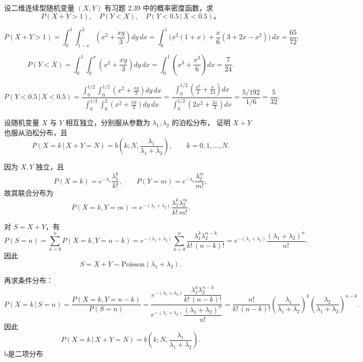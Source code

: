 \begin{homework}[53]

设二维连续型随机变量 $(X,Y)$ 有习题 2.39 中的概率密度函数，求
\[
P(X+Y>1),\quad P(Y<X),\quad P(Y<0.5\,|\,X<0.5)。
\]
\end{homework}
\begin{solution}
\[
P(X+Y>1)=\int_{0}^{1}\int_{1-x}^{2}\!\left(x^2+\frac{xy}{3}\right)dy\,dx
=\int_{0}^{1}\!\Big(x^2(1+x)+\frac{x}{6}(3+2x-x^2)\Big)\,dx=\frac{65}{72}.
\]

\[
P(Y<X)=\int_{0}^{1}\int_{0}^{x}\!\left(x^2+\frac{xy}{3}\right)dy\,dx
=\int_{0}^{1}\!\left(x^3+\frac{x^3}{6}\right)dx=\frac{7}{24}.
\]

\[
P(Y<0.5\,|\,X<0.5)
=\frac{\displaystyle\int_{0}^{1/2}\int_{0}^{1/2}\!\left(x^2+\frac{xy}{3}\right)dy\,dx}
{\displaystyle\int_{0}^{1/2}\int_{0}^{2}\!\left(x^2+\frac{xy}{3}\right)dy\,dx}
=\frac{\displaystyle\int_{0}^{1/2}\!\left(\frac{x^2}{2}+\frac{x}{24}\right)dx}{\displaystyle\int_{0}^{1/2}\!\left(2x^2+\frac{2x}{3}\right)dx}
=\frac{5/192}{1/6}=\frac{5}{32}.
\]
\end{solution}
\begin{homework}[56]
设随机变量 $X$ 与 $Y$ 相互独立，分别服从参数为 $\lambda_1,\lambda_2$ 的泊松分布，
证明 $X+Y$ 也服从泊松分布，且
\[
P(X=k\,|\,X+Y=N)=b\!\left(k;N,\frac{\lambda_1}{\lambda_1+\lambda_2}\right),\qquad k=0,1,\dots,N.
\]
\end{homework}
\begin{solution}
因为 $X,Y$ 独立，且
\[
P(X=k)=e^{-\lambda_1}\frac{\lambda_1^k}{k!},\qquad
P(Y=m)=e^{-\lambda_2}\frac{\lambda_2^m}{m!},
\]
故其联合分布为
\[
P(X=k,Y=m)=e^{-(\lambda_1+\lambda_2)}\frac{\lambda_1^k\lambda_2^m}{k!\,m!}.
\]

对 $S=X+Y$，有
\[
P(S=n)
=\sum_{k=0}^{n}P(X=k,Y=n-k)
=e^{-(\lambda_1+\lambda_2)}
\sum_{k=0}^{n}\frac{\lambda_1^k\lambda_2^{n-k}}{k!\,(n-k)!}
=e^{-(\lambda_1+\lambda_2)}\frac{(\lambda_1+\lambda_2)^n}{n!}.
\]
因此
\[
S=X+Y\sim\mathrm{Poisson}(\lambda_1+\lambda_2).
\]

再求条件分布：
\[
P(X=k\,|\,S=n)
=\frac{P(X=k,Y=n-k)}{P(S=n)}
=\frac{e^{-(\lambda_1+\lambda_2)}\dfrac{\lambda_1^k\lambda_2^{n-k}}{k!\,(n-k)!}}
{e^{-(\lambda_1+\lambda_2)}\dfrac{(\lambda_1+\lambda_2)^n}{n!}}
=\frac{n!}{k!\,(n-k)!}
\left(\frac{\lambda_1}{\lambda_1+\lambda_2}\right)^k
\left(\frac{\lambda_2}{\lambda_1+\lambda_2}\right)^{n-k}.
\]
因此
\[
\boxed{P(X=k\,|\,X+Y=N)
=b\!\left(k;N,\frac{\lambda_1}{\lambda_1+\lambda_2}\right)}.
\]
b是二项分布
\end{solution}

